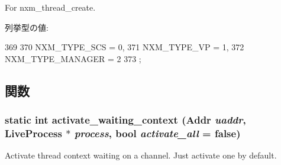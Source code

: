 For nxm\_\-thread\_\-create. \begin{Desc}
\item[列挙型の値: ]\par
\begin{description}
\item[{\em 
\hypertarget{classTru64_a047f3ab687492e1d75f613e182664384a3ac97f98b04f22186a86480ad5fa471d}{
NXM\_\-TYPE\_\-SCS}
\label{classTru64_a047f3ab687492e1d75f613e182664384a3ac97f98b04f22186a86480ad5fa471d}
}]\item[{\em 
\hypertarget{classTru64_a047f3ab687492e1d75f613e182664384a1d6a136a94a41d702244a74edccdb312}{
NXM\_\-TYPE\_\-VP}
\label{classTru64_a047f3ab687492e1d75f613e182664384a1d6a136a94a41d702244a74edccdb312}
}]\item[{\em 
\hypertarget{classTru64_a047f3ab687492e1d75f613e182664384a94b977628442e840a44dd81fdeb105ae}{
NXM\_\-TYPE\_\-MANAGER}
\label{classTru64_a047f3ab687492e1d75f613e182664384a94b977628442e840a44dd81fdeb105ae}
}]\end{description}
\end{Desc}




\begin{DoxyCode}
369                          {
370         NXM_TYPE_SCS    = 0,
371         NXM_TYPE_VP             = 1,
372         NXM_TYPE_MANAGER        = 2
373     };
\end{DoxyCode}


\subsection{関数}
\hypertarget{classTru64_aaef9d5f33173de4f6d2875193eb83d7a}{
\subsubsection[{activate\_\-waiting\_\-context}]{\setlength{\rightskip}{0pt plus 5cm}static int activate\_\-waiting\_\-context ({\bf Addr} {\em uaddr}, \/  {\bf LiveProcess} $\ast$ {\em process}, \/  bool {\em activate\_\-all} = {\ttfamily false})}}
\label{classTru64_aaef9d5f33173de4f6d2875193eb83d7a}
Activate thread context waiting on a channel. Just activate one by default. 


